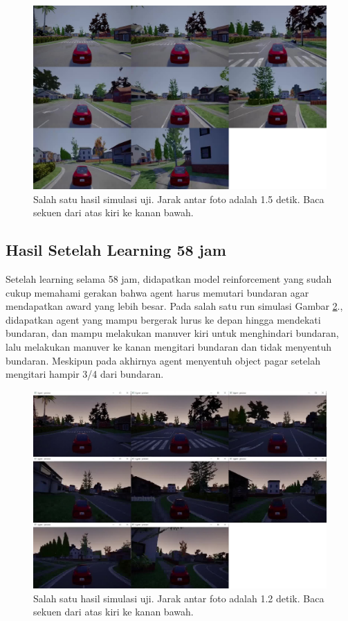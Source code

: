 \begin{figure}[H] 
	\centering
	\includegraphics[width=1\linewidth]{images/uji0}
	\caption{Salah satu hasil simulasi uji. Jarak antar foto adalah 1.5 detik. Baca sekuen dari atas kiri ke kanan bawah.}
	\label{fig:uji0}
\end{figure}

\subsection{Hasil Setelah Learning 58 jam}
\label{sec:hasil_learning_12}
Setelah learning selama 58 jam, didapatkan model reinforcement yang sudah cukup memahami gerakan bahwa agent harus memutari bundaran agar mendapatkan award yang lebih besar. Pada salah satu run simulasi Gambar \ref{fig:uji1}., didapatkan agent yang mampu bergerak lurus ke depan hingga mendekati bundaran, dan mampu melakukan manuver kiri untuk menghindari bundaran, lalu melakukan manuver ke kanan mengitari bundaran dan tidak menyentuh bundaran. Meskipun pada akhirnya agent menyentuh object pagar setelah mengitari hampir 3/4 dari bundaran.
\begin{figure}[H] 
	\centering
	\includegraphics[width=1\linewidth]{images/uji1}
	\caption{Salah satu hasil simulasi uji. Jarak antar foto adalah 1.2 detik. Baca sekuen dari atas kiri ke kanan bawah.}
	\label{fig:uji1}
\end{figure}
\fi
